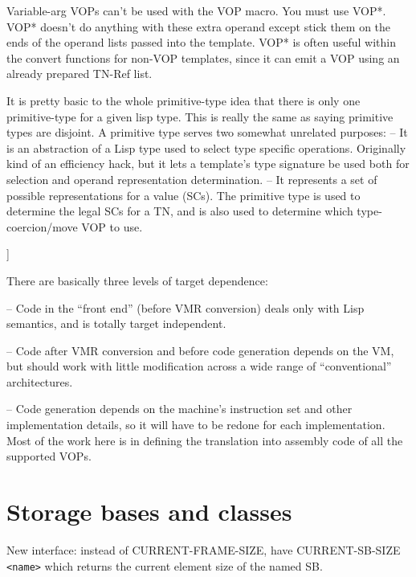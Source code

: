     Variable-arg VOPs can't be used with the VOP macro.  You must use VOP*.
    VOP* doesn't do anything with these extra operand except stick them on the
    ends of the operand lists passed into the template.  VOP* is often useful
    within the convert functions for non-VOP templates, since it can emit a VOP
    using an already prepared TN-Ref list.
    

    It is pretty basic to the whole primitive-type idea that there is only one
    primitive-type for a given lisp type.  This is really the same as saying
    primitive types are disjoint.  A primitive type serves two somewhat
    unrelated purposes:
     -- It is an abstraction of a Lisp type used to select type specific
        operations.  Originally kind of an efficiency hack, but it lets a
        template's type signature be used both for selection and operand
        representation determination.
     -- It represents a set of possible representations for a value (SCs).  The
        primitive type is used to determine the legal SCs for a TN, and is also
        used to determine which type-coercion/move VOP to use.

]

There are basically three levels of target dependence:

 -- Code in the ``front end'' (before VMR conversion) deals only with Lisp
    semantics, and is totally target independent.

 -- Code after VMR conversion and before code generation depends on the VM,
    but should work with little modification across a wide range of
    ``conventional'' architectures.

 -- Code generation depends on the machine's instruction set and other
    implementation details, so it will have to be redone for each
    implementation.  Most of the work here is in defining the translation into
    assembly code of all the supported VOPs.


\chapter{Storage bases and classes}
New interface: instead of CURRENT-FRAME-SIZE, have CURRENT-SB-SIZE \verb+<name>+ which
returns the current element size of the named SB.

